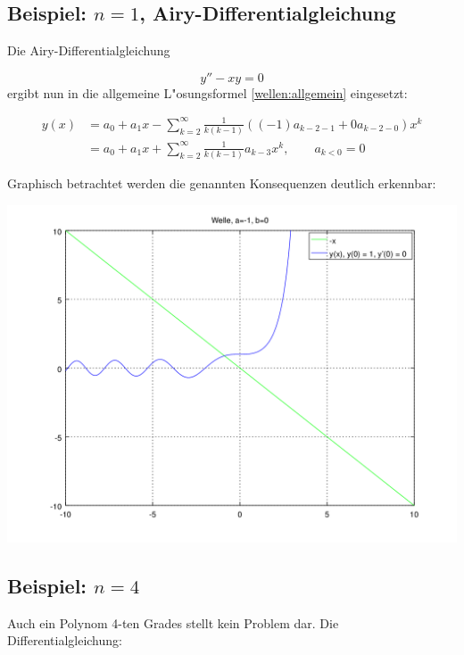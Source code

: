 \subsection{Beispiel: $n = 1$, Airy-Differentialgleichung}
Die Airy-Differentialgleichung

\begin{equation*}
	y''-xy = 0
\end{equation*}
ergibt nun in die allgemeine L"osungsformel \ref{wellen:allgemein} eingesetzt:

\begin{equation*}
\begin{split}
	y(x) &= a_0+a_1x-\sum_{k=2}^{\infty} \frac{1}{k(k-1)} ((-1) a_{k-2-1} + 0 
	a_{k-2-0}) x^k
	\\
	&= a_0+a_1x+\sum_{k=2}^{\infty} \frac{1}{k(k-1)} a_{k-3} x^k,
	\qquad a_{k < 0} = 0
\end{split}
\end{equation*}

Graphisch betrachtet werden die genannten Konsequenzen deutlich erkennbar:

\begin{center}
	\includegraphics[scale=0.53]{./wellen/images/allgemein/n1.png}
\end{center}

\subsection{Beispiel: $n = 4$}

Auch ein Polynom 4-ten Grades stellt kein Problem dar. Die 
Differentialgleichung:

